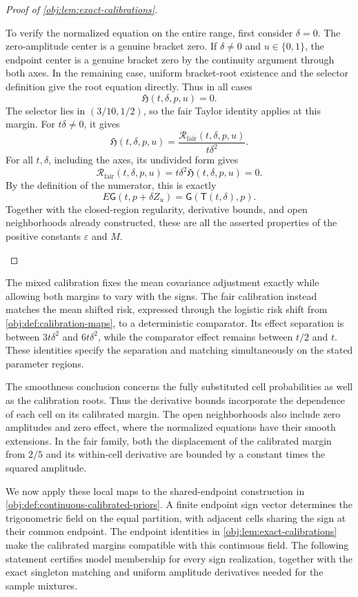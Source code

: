 \documentclass[11pt]{article}
\begin{document}
\begin{proof}[Proof of \cref{obj:lem:exact-calibrations}]
\begin{enumerate}
To verify the normalized equation on the entire range, first consider \(\delta=0\). The zero-amplitude center is a genuine bracket zero. If \(\delta\ne0\) and \(u\in\{0,1\}\), the endpoint center is a genuine bracket zero by the continuity argument through both axes. In the remaining case, uniform bracket-root existence and the selector definition give the root equation directly. Thus in all cases
\[
\mathfrak H(t,\delta,p,u)=0.
\]
The selector lies in \((3/10,1/2)\), so the fair Taylor identity applies at this margin. For \(t\delta\ne0\), it gives
\[
\mathfrak H(t,\delta,p,u)
=
\frac{\mathcal R_{\mathrm{fair}}(t,\delta,p,u)}{t\delta^2}.
\]
For all \(t,\delta\), including the axes, its undivided form gives
\[
\mathcal R_{\mathrm{fair}}(t,\delta,p,u)
=t\delta^2\mathfrak H(t,\delta,p,u)=0.
\]
By the definition of the numerator, this is exactly
\[
E\mathsf G(t,p+\delta Z_u)
=\mathsf G(\mathsf T(t,\delta),p).
\]
Together with the closed-region regularity, derivative bounds, and open neighborhoods already constructed, these are all the asserted properties of the positive constants \(\varepsilon\) and \(M\).
\end{enumerate}
\end{proof}

The mixed calibration fixes the mean covariance adjustment exactly while allowing both margins to vary with the signs. The fair calibration instead matches the mean shifted risk, expressed through the logistic risk shift  from \cref{obj:def:calibration-maps}, to a deterministic comparator. Its effect separation is between \(3t\delta^2\) and \(6t\delta^2\), while the comparator effect remains between \(t/2\) and \(t\). These identities specify the separation and matching simultaneously on the stated parameter regions.

The smoothness conclusion concerns the fully substituted cell probabilities as well as the calibration roots. Thus the derivative bounds incorporate the dependence of each cell on its calibrated margin. The open neighborhoods also include zero amplitudes and zero effect, where the normalized equations have their smooth extensions. In the fair family, both the displacement of the calibrated margin from \(2/5\) and its within-cell derivative are bounded by a constant times the squared amplitude.

We now apply these local maps to the shared-endpoint construction in \cref{obj:def:continuous-calibrated-priors}. A finite endpoint sign vector  determines the trigonometric field on the equal partition, with adjacent cells sharing the sign at their common endpoint. The endpoint identities in \cref{obj:lem:exact-calibrations} make the calibrated margins compatible with this continuous field. The following statement certifies model membership for every sign realization, together with the exact singleton matching and uniform amplitude derivatives needed for the sample mixtures.
\end{document}
